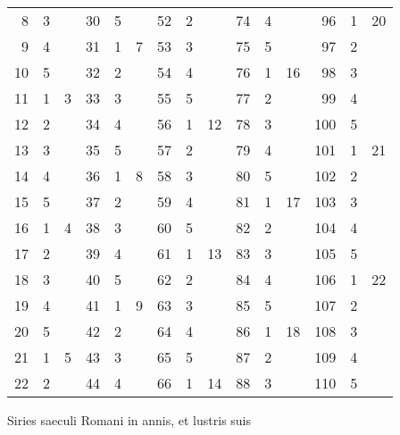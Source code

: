 \begin{tabnums}
\begin{tabular}{@{} *{15}{r} @{}}
  8 & 3 & ~ & 30 & 5 & ~ & 52 & 2 &  ~ & 74 & 4 &  ~ &  96 & 1 & 20 \\
              \cline{4-6}
  9 & 4 & ~ & 31 & 1 & 7 & 53 & 3 &  ~ & 75 & 5 &  ~ &  97 & 2 &  ~ \\
                                         \cline{10-12}
 10 & 5 &   & 32 & 2 &   & 54 & 4 &    & 76 & 1 & 16 &  98 & 3 &    \\
  \cline{1-3}
 11 & 1 & 3 & 33 & 3 &   & 55 & 5 &    & 77 & 2 &    &  99 & 4 &    \\
                           \cline{7-9}
 12 & 2 &   & 34 & 4 &   & 56 & 1 & 12 & 78 & 3 &    & 100 & 5 &    \\
                                                       \cline{13-15}
 13 & 3 &   & 35 & 5 &   & 57 & 2 &    & 79 & 4 &    & 101 & 1 & 21 \\
              \cline{4-6}
 14 & 4 &   & 36 & 1 & 8 & 58 & 3 &    & 80 & 5 &    & 102 & 2 &    \\
                                         \cline{10-12}
 15 & 5 &   & 37 & 2 &   & 59 & 4 &    & 81 & 1 & 17 & 103 & 3 &    \\
  \cline{1-3}
 16 & 1 & 4 & 38 & 3 &   & 60 & 5 &    & 82 & 2 &    & 104 & 4 &    \\
                           \cline{7-9}
 17 & 2 &   & 39 & 4 &   & 61 & 1 & 13 & 83 & 3 &    & 105 & 5 &    \\
                                                       \cline{13-15}
 18 & 3 &   & 40 & 5 &   & 62 & 2 &    & 84 & 4 &    & 106 & 1 & 22 \\
              \cline{4-6}
 19 & 4 &   & 41 & 1 & 9 & 63 & 3 &    & 85 & 5 &    & 107 & 2 &    \\
                                         \cline{10-12}
 20 & 5 &   & 42 & 2 &   & 64 & 4 &    & 86 & 1 & 18 & 108 & 3 &    \\
  \cline{1-3}
 21 & 1 & 5 & 43 & 3 &   & 65 & 5 &    & 87 & 2 &    & 109 & 4 &    \\
                           \cline{7-9}
 22 & 2 &   & 44 & 4 &   & 66 & 1 & 14 & 88 & 3 &    & 110 & 5 &    \\
\bottomrule
\end{tabular}
%
\caption{Siries saeculi Romani in annis, et lustris suis}
\label{tab:p183}
%
\end{tabnums}
